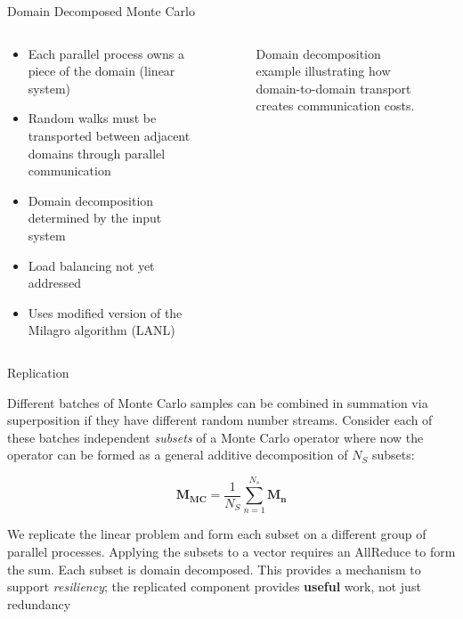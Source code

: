 \documentclass{beamer}
\begin{document}
\begin{frame}{Domain Decomposed Monte Carlo}

  \begin{columns}
    \begin{column}{0.5\textwidth}
      \begin{itemize}
        \setlength{\itemsep}{-0.4\baselineskip}
      \item Each parallel process owns a piece of the domain (linear
        system)
        \bigskip
      \item Random walks must be transported between adjacent domains
        through parallel communication
        \bigskip
      \item Domain decomposition determined by the input system
        \bigskip
      \item Load balancing not yet addressed
        \bigskip
      \item Uses modified version of the Milagro algorithm (LANL)
      \end{itemize}
    \end{column}

    \begin{column}{0.5\textwidth}
      \begin{figure}[htpb!]
        \begin{center}
          \scalebox{0.75}{  }
        \end{center}
        \caption{\small Domain decomposition example illustrating
          how domain-to-domain transport creates communication costs.}
      \end{figure}
    \end{column}
  \end{columns}

\end{frame}


\begin{frame}{Replication}

  \vspace{-0.1in}

  Different batches of Monte Carlo samples can be combined in summation via
  superposition if they have different random number streams.  Consider each
  of these batches independent \textit{subsets} of a Monte Carlo operator
  where now the operator can be formed as a general additive decomposition of
  $N_S$ subsets:

  \[
  \mathbf{M_{MC}} = \frac{1}{N_S}\sum_{n=1}^{N_s}{\mathbf{M_n}}
  \]

  We replicate the linear problem and form each subset on a different group of
  parallel processes. Applying the subsets to a vector requires an AllReduce
  to form the sum. Each subset is domain decomposed.
  \vfill
  This provides a mechanism to support \textit{resiliency}; the replicated
  component provides {\bf useful} work, not just redundancy

\end{frame}
\end{document}

